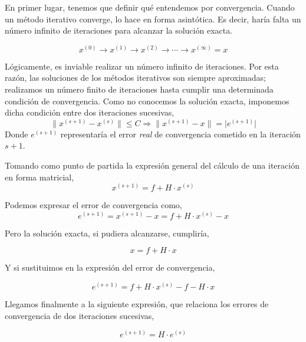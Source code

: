 En primer lugar, tenemos que definir qué entendemos por convergencia. Cuando un método iterativo converge, lo hace en forma asintótica. Es decir, haría falta un número infinito de iteraciones para alcanzar la solución exacta.

\begin{equation*}
x^{(0)}\rightarrow x^{(1)} \rightarrow x^{(2)}\rightarrow \cdots \rightarrow x^{(\infty)}=x
\end{equation*}

Lógicamente, es inviable realizar un número infinito de iteraciones. Por esta razón, las soluciones de los métodos iterativos son siempre aproximadas; realizamos un número finito de iteraciones hasta cumplir una determinada condición de convergencia. Como no conocemos la solución exacta, imponemos dicha condición entre dos iteraciones sucesivas,
\begin{equation*}
 \lVert x^{(s+1)}-x^{(s)}\rVert \leq C \Rightarrow  \lVert x^{(s+1)}-x\rVert = \lvert e^{(s+1)} \rvert
\end{equation*}
Donde $e^{(s+1)}$ representaría el error \emph{real} de convergencia cometido en la iteración $s+1$.

Tomando como punto de partida la expresión general del cálculo de una iteración en forma matricial,
\begin{equation*}
x^{(s+1)}=f+H\cdot x^{(s)}
\end{equation*}

Podemos expresar el error de convergencia como,
\begin{equation*}
e^{(s+1)}=x^{(s+1)}-x=f+H\cdot x^{(s)}-x
\end{equation*}

Pero la solución exacta, si pudiera alcanzarse, cumpliría,

\begin{equation*}
x=f+H\cdot x
\end{equation*}

Y si sustituimos en la expresión del error de convergencia,

\begin{equation*}
e^{(s+1)}=f+H\cdot x^{(s)}-f-H\cdot x
\end{equation*}

Llegamos finalmente a la siguiente expresión, que relaciona los errores de convergencia de dos iteraciones sucesivas,

\begin{equation*}
e^{(s+1)}=H\cdot e^{(s)}
\end{equation*}

